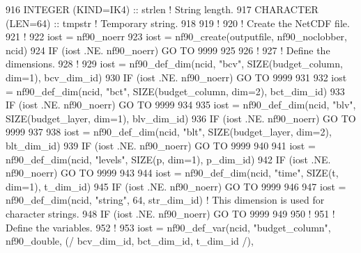 \begin{DoxyCode}
916     \textcolor{keywordtype}{INTEGER (KIND=IK4)}          :: strlen                                               \textcolor{comment}{! String length.}
917     \textcolor{keywordtype}{CHARACTER (LEN=64)}          :: tmpstr                                               \textcolor{comment}{! Temporary string.}
918 
919     \textcolor{comment}{!}
920     \textcolor{comment}{! Create the NetCDF file.}
921     \textcolor{comment}{!}
922     iost    = nf90\_noerr
923     iost    = nf90\_create(outputfile, nf90\_noclobber, ncid)
924     \textcolor{keywordflow}{IF} (iost .NE. nf90\_noerr) \textcolor{keywordflow}{GO TO} 9999
925 
926     \textcolor{comment}{!}
927     \textcolor{comment}{! Define the dimensions.}
928     \textcolor{comment}{!}
929     iost    = nf90\_def\_dim(ncid, \textcolor{stringliteral}{"bcv"}, \textcolor{keyword}{SIZE}(budget\_column, dim=1), bcv\_dim\_id)
930     \textcolor{keywordflow}{IF} (iost .NE. nf90\_noerr) \textcolor{keywordflow}{GO TO} 9999
931 
932     iost    = nf90\_def\_dim(ncid, \textcolor{stringliteral}{"bct"}, \textcolor{keyword}{SIZE}(budget\_column, dim=2), bct\_dim\_id)
933     \textcolor{keywordflow}{IF} (iost .NE. nf90\_noerr) \textcolor{keywordflow}{GO TO} 9999
934 
935     iost    = nf90\_def\_dim(ncid, \textcolor{stringliteral}{"blv"}, \textcolor{keyword}{SIZE}(budget\_layer, dim=1), blv\_dim\_id)
936     \textcolor{keywordflow}{IF} (iost .NE. nf90\_noerr) \textcolor{keywordflow}{GO TO} 9999
937 
938     iost    = nf90\_def\_dim(ncid, \textcolor{stringliteral}{"blt"}, \textcolor{keyword}{SIZE}(budget\_layer, dim=2), blt\_dim\_id)
939     \textcolor{keywordflow}{IF} (iost .NE. nf90\_noerr) \textcolor{keywordflow}{GO TO} 9999
940 
941     iost    = nf90\_def\_dim(ncid, \textcolor{stringliteral}{"levels"}, \textcolor{keyword}{SIZE}(p, dim=1), p\_dim\_id)
942     \textcolor{keywordflow}{IF} (iost .NE. nf90\_noerr) \textcolor{keywordflow}{GO TO} 9999
943 
944     iost    = nf90\_def\_dim(ncid, \textcolor{stringliteral}{"time"}, \textcolor{keyword}{SIZE}(t, dim=1), t\_dim\_id)
945     \textcolor{keywordflow}{IF} (iost .NE. nf90\_noerr) \textcolor{keywordflow}{GO TO} 9999
946 
947     iost    = nf90\_def\_dim(ncid, \textcolor{stringliteral}{"string"}, 64, str\_dim\_id)                  \textcolor{comment}{! This dimension is used for
       character strings.}
948     \textcolor{keywordflow}{IF} (iost .NE. nf90\_noerr) \textcolor{keywordflow}{GO TO} 9999
949 
950     \textcolor{comment}{!}
951     \textcolor{comment}{! Define the variables.}
952     \textcolor{comment}{!}
953     iost    = nf90\_def\_var(ncid, \textcolor{stringliteral}{"budget\_column"}, nf90\_double, (/ bcv\_dim\_id, bct\_dim\_id, t\_dim\_id /), 

\end{DoxyCode}
